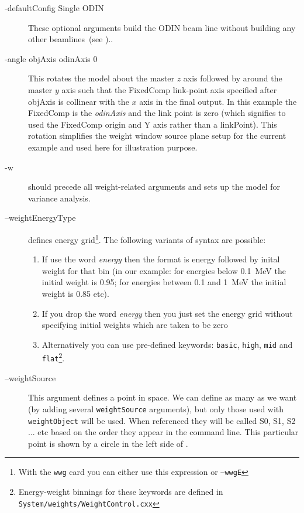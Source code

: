   \begin{description}
\item[-defaultConfig Single ODIN ] These optional arguments build the ODIN beam line
  without building any other beamlines~(see )..

\item[-angle objAxis odinAxis 0] This rotates the model about the 
  master $z$ axis followed by around the master $y$ axis such that
  the FixedComp link-point axis specified after objAxis is collinear with the
  $x$ axis in the final output. In this example the FixedComp is the {\it odinAxis}
  and the link point is zero (which signifies to used the FixedComp origin and Y axis
  rather than a linkPoint).
  This rotation simplifies the weight window source plane setup
  for the current example and used here for illustration purpose.

\item[-w] should precede all weight-related arguments and sets up the model for variance analysis.
  
\item[--weightEnergyType] defines energy grid\footnote{With the {\tt wwg} card you can either use this expression or
  {\tt --wwgE}}.
  The following variants of syntax are possible:
  \begin{enumerate}
    \item If use the word {\em energy} then the format is energy followed by inital weight for that bin
      (in our example: for energies below \SI{0.1}{\mega\electronvolt} the initial weight is \num{0.95};
          for energies between \num{0.1} and \SI{1}{\mega\electronvolt} the initial weight is \num{0.85} etc).
        \item If you drop the word {\em energy} then you just set the energy grid without specifying initial weights
          which are taken to be zero
    \item Alternatively you can use pre-defined keywords:
      {\tt basic}, {\tt high}, {\tt mid} and {\tt flat}\footnote{Energy-weight binnings for these keywords are defined in \tt{System/weights/WeightControl.cxx}}.
  \end{enumerate}
  
\item[--weightSource] This argument defines a point in space.
  We can define as many as we want (by adding several {\tt weightSource} arguments),
  but only those used with {\tt weightObject} will be used. When referenced they will be called S0, S1, S2 ... etc
  based on the order they appear in the command line.
  This particular point is shown by a circle in the left side of .
  

\end{description}
